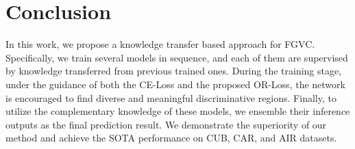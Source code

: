 \documentclass{article}
\begin{document}
\section{Conclusion}



In this work, we propose a knowledge transfer based approach for FGVC. Specifically, we train several models in sequence, and each of them are supervised by knowledge transferred from previous trained ones. During the training stage, under the guidance of both the CE-Loss and the proposed OR-Loss, the network is encouraged to find diverse and meaningful discriminative regions. Finally, to utilize the complementary knowledge of these models, we ensemble their inference outputs as the final prediction result. We demonstrate the superiority of our method and achieve the SOTA performance on CUB, CAR, and 
AIR datasets.


\end{document}
